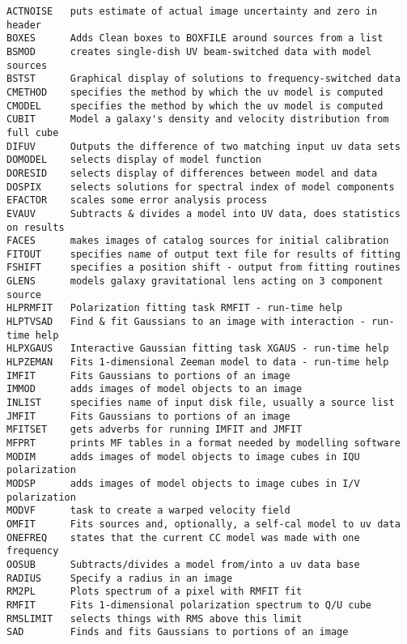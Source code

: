 
\vskip 0.5pt
\bbve\begin{verbatim}
ACTNOISE   puts estimate of actual image uncertainty and zero in header
BOXES      Adds Clean boxes to BOXFILE around sources from a list
BSMOD      creates single-dish UV beam-switched data with model sources
BSTST      Graphical display of solutions to frequency-switched data
CMETHOD    specifies the method by which the uv model is computed
CMODEL     specifies the method by which the uv model is computed
CUBIT      Model a galaxy's density and velocity distribution from full cube
DIFUV      Outputs the difference of two matching input uv data sets
DOMODEL    selects display of model function
DORESID    selects display of differences between model and data
DOSPIX     selects solutions for spectral index of model components
EFACTOR    scales some error analysis process
EVAUV      Subtracts & divides a model into UV data, does statistics on results
FACES      makes images of catalog sources for initial calibration
FITOUT     specifies name of output text file for results of fitting
FSHIFT     specifies a position shift - output from fitting routines
GLENS      models galaxy gravitational lens acting on 3 component source
HLPRMFIT   Polarization fitting task RMFIT - run-time help
HLPTVSAD   Find & fit Gaussians to an image with interaction - run-time help
HLPXGAUS   Interactive Gaussian fitting task XGAUS - run-time help
HLPZEMAN   Fits 1-dimensional Zeeman model to data - run-time help
IMFIT      Fits Gaussians to portions of an image
IMMOD      adds images of model objects to an image
INLIST     specifies name of input disk file, usually a source list
JMFIT      Fits Gaussians to portions of an image
MFITSET    gets adverbs for running IMFIT and JMFIT
MFPRT      prints MF tables in a format needed by modelling software
MODIM      adds images of model objects to image cubes in IQU polarization
MODSP      adds images of model objects to image cubes in I/V polarization
MODVF      task to create a warped velocity field
OMFIT      Fits sources and, optionally, a self-cal model to uv data
ONEFREQ    states that the current CC model was made with one frequency
OOSUB      Subtracts/divides a model from/into a uv data base
RADIUS     Specify a radius in an image
RM2PL      Plots spectrum of a pixel with RMFIT fit
RMFIT      Fits 1-dimensional polarization spectrum to Q/U cube
RMSLIMIT   selects things with RMS above this limit
SAD        Finds and fits Gaussians to portions of an image

\end{verbatim}
